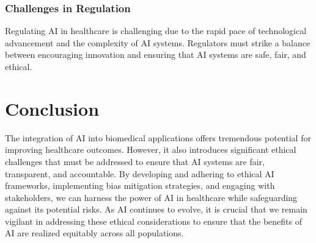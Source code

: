 \documentclass{article}
\begin{document}
\subsubsection{Challenges in Regulation}
Regulating AI in healthcare is challenging due to the rapid pace of technological advancement and the complexity of AI systems. Regulators must strike a balance between encouraging innovation and ensuring that AI systems are safe, fair, and ethical.

\section{Conclusion}
The integration of AI into biomedical applications offers tremendous potential for improving healthcare outcomes. However, it also introduces significant ethical challenges that must be addressed to ensure that AI systems are fair, transparent, and accountable. By developing and adhering to ethical AI frameworks, implementing bias mitigation strategies, and engaging with stakeholders, we can harness the power of AI in healthcare while safeguarding against its potential risks. As AI continues to evolve, it is crucial that we remain vigilant in addressing these ethical considerations to ensure that the benefits of AI are realized equitably across all populations.
\end{document}
